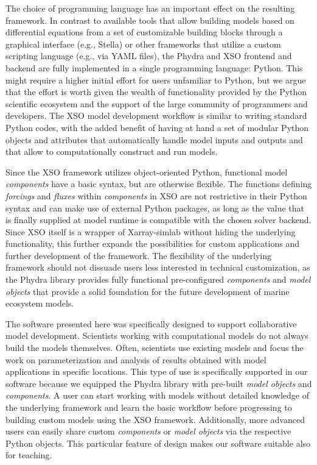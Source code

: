 \documentclass[journal abbreviation, manuscript]{copernicus}
\begin{document}
The choice of programming language has an important effect on the resulting framework. In contrast to available tools that allow building models based on differential equations from a set of customizable building blocks through a graphical interface (e.g., Stella) or other frameworks that utilize a custom scripting language (e.g., via YAML files), the Phydra and XSO frontend and backend are fully implemented in a single programming language: Python. This might require a higher initial effort for users unfamiliar to Python, but we argue that the effort is worth given the wealth of functionality provided by the Python scientific ecosystem and the support of the large community of programmers and developers. The XSO model development workflow is similar to writing standard Python codes, with the added benefit of having at hand a set of modular Python objects and attributes that automatically handle model inputs and outputs and that allow to computationally construct and run models. 

Since the XSO framework utilizes object-oriented Python, functional model \textit{components} have a basic syntax, but are otherwise flexible. The functions defining \textit{forcings} and \textit{fluxes} within \textit{components} in XSO are not restrictive in their Python syntax and can make use of external Python packages, as long as the value that is finally supplied at model runtime is compatible with the chosen solver backend. Since XSO itself is a wrapper of Xarray-simlab without hiding the underlying functionality, this further expands the possibilities for custom applications and further development of the framework. The flexibility of the underlying framework should not dissuade users less interested in technical customization, as the Phydra library provides fully functional pre-configured \textit{components} and \textit{model objects} that provide a solid foundation for the future development of marine ecosystem models. 


The software presented here was specifically designed to support collaborative model development. Scientists working with computational models do not always build the models themselves. Often, scientists use existing models and focus the work on parameterization and analysis of results obtained with model applications in specific locations. This type of use is specifically supported in our software because we equipped the Phydra library with pre-built \textit{model objects} and \textit{components}. A user can start working with models without detailed knowledge of the underlying framework and learn the basic workflow before progressing to building custom models using the XSO framework. Additionally, more advanced users can easily share custom \textit{components} or \textit{model objects} via the respective Python objects. This particular feature of design makes our software suitable also for teaching. 
\end{document}
